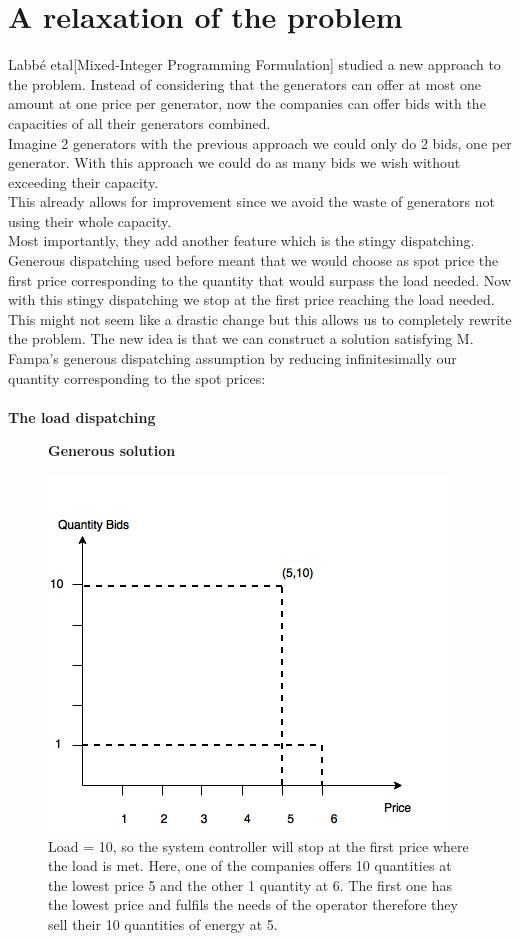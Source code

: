 \documentclass[letterpaper]{article}
\begin{document}
\section{A relaxation of the problem}
Labb\'e etal[Mixed-Integer Programming Formulation] studied a new approach to the problem. Instead of considering that the generators can offer at most one amount at one price per generator, now the companies can offer bids with the capacities of all their generators combined.\\
Imagine 2 generators with the previous approach we could only do 2 bids, one per generator. With this approach we could do as many bids we wish without exceeding their capacity.\\
This already allows for improvement since we avoid the waste of generators not using their whole capacity.\\ Most importantly, they add another feature which is the stingy dispatching.\\
Generous dispatching used before meant that we would choose as spot price the first price corresponding to the quantity that would surpass the load needed. Now with this stingy dispatching we stop at the first price reaching the load needed. \\
This might not seem like a drastic change but this allows us to completely rewrite the problem. The new idea is that we can construct a solution satisfying M. Fampa's generous dispatching assumption by reducing infinitesimally our quantity corresponding to the spot prices: \\\\
\textbf{The load dispatching}
\begin{figure}[!ht]
\centering
\textbf{Generous solution}\par\medskip
\includegraphics[scale=0.45]{../documentation/Generous.png}
\caption{Load = 10, so the system controller will stop at the first price where the load is met. Here, one of the companies offers 10 quantities at the lowest price 5 and the other 1 quantity at 6. The first one has the lowest price and fulfils the needs of the operator therefore they sell their 10 quantities of energy at 5.}
\end{figure}
\end{document}
